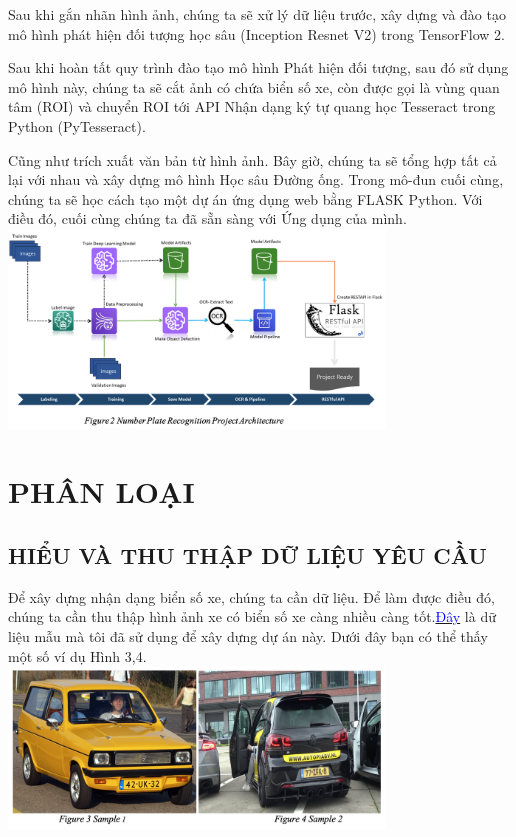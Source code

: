 \documentclass{article}
\begin{document}
Sau khi gắn nhãn hình ảnh, chúng ta sẽ xử lý dữ liệu trước, xây dựng và đào tạo mô hình phát hiện đối tượng học sâu (Inception Resnet V2) trong TensorFlow 2.

Sau khi hoàn tất quy trình đào tạo mô hình Phát hiện đối tượng, sau đó sử dụng mô hình này, chúng ta sẽ cắt ảnh có chứa biển số xe, còn được gọi là vùng quan tâm (ROI) và chuyển ROI tới API Nhận dạng ký tự quang học Tesseract trong Python (PyTesseract).

Cũng như trích xuất văn bản từ hình ảnh. Bây giờ, chúng ta sẽ tổng hợp tất cả lại với nhau và xây dựng mô hình Học sâu Đường ống. Trong mô-đun cuối cùng, chúng ta sẽ học cách tạo một dự án ứng dụng web bằng FLASK Python. Với điều đó, cuối cùng chúng ta đã sẵn sàng với Ứng dụng của mình.\\
\includegraphics[width=10cm]{img/img1/Notebook4.png}\\

\section{PHÂN LOẠI}
\subsection{HIỂU VÀ THU THẬP DỮ LIỆU YÊU CẦU}
Để xây dựng nhận dạng biển số xe, chúng ta cần dữ liệu. Để làm được điều đó, chúng ta cần thu thập hình ảnh xe có biển số xe càng nhiều càng tốt.\href{https://github.com/Asikpalysik/Automatic-License-Plate-Detection/tree/main/images}{\textcolor{blue}{Đây}} là dữ liệu mẫu mà tôi đã sử dụng để xây dựng dự án này. Dưới đây bạn có thể thấy một số ví dụ Hình 3,4.\\
\includegraphics[width= 10cm]{img/img1/Notebook5.png}
\newpage
\end{document}
